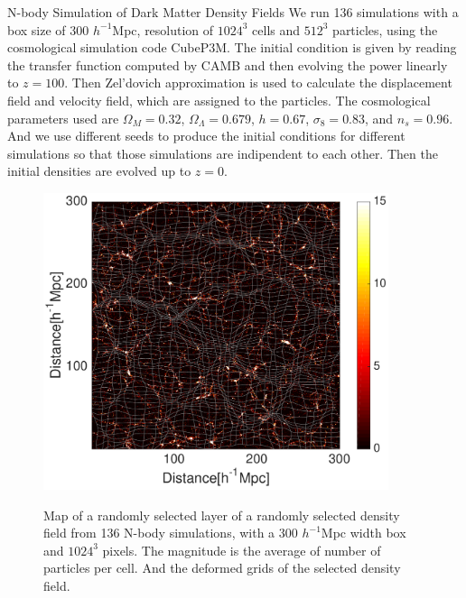 \begin{section}{N-body Simulation of Dark Matter Density Fields}
  \label{sec:simulation}
    We run 136 simulations with a box size of 300 $h^{-1}$Mpc, resolution of $1024^3$ cells and $512^3$ particles, using the cosmological simulation code CubeP3M\cite{bib:Harnois2013}. The initial condition is given by reading the transfer function computed by CAMB\cite{bib:Lewis2000} and then evolving the power linearly to $z=100$. Then Zel'dovich approximation is used to calculate the displacement field and velocity field, which are assigned to the particles. The cosmological parameters used are $\Omega_M=0.32$, $\Omega_{\Lambda}=0.679$, $h=0.67$, $\sigma_8=0.83$, and $n_s=0.96$. And we use different seeds to produce the initial conditions for different simulations so that those simulations are indipendent to each other. Then the initial densities are evolved up to $z=0$.
\begin{figure}[t!]
\centering
 \includegraphics[width=0.9\textwidth]{reconstruction-crop.pdf}
 \label{fig:simandrec}
   \caption{
Map of a randomly selected layer of a randomly selected density field from 136 N-body simulations, with a 300 $h^{-1}$Mpc width box and $1024^3$ pixels. The magnitude is the average of number of particles per cell. And the deformed grids of the selected density field.}
\end{figure}

\end{section}

